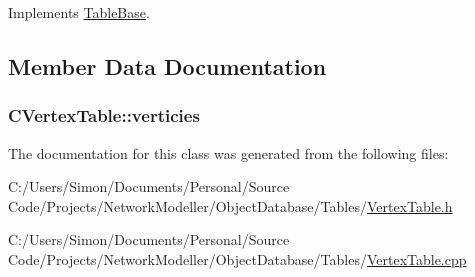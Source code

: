 Implements \hyperlink{class_table_base_a4a4e674632425ee19c24fae2881caefc}{Table\+Base}.



\subsection{Member Data Documentation}
\hypertarget{class_c_vertex_table_a57e0aed3f5222453d13ca5816477354b}{}
\subsubsection[{verticies}]{ C\+Vertex\+Table\+::verticies}\label{class_c_vertex_table_a57e0aed3f5222453d13ca5816477354b}


The documentation for this class was generated from the following files\+:\begin{DoxyCompactItemize}
\item 
C\+:/\+Users/\+Simon/\+Documents/\+Personal/\+Source Code/\+Projects/\+Network\+Modeller/\+Object\+Database/\+Tables/\hyperlink{_vertex_table_8h}{Vertex\+Table.\+h}\item 
C\+:/\+Users/\+Simon/\+Documents/\+Personal/\+Source Code/\+Projects/\+Network\+Modeller/\+Object\+Database/\+Tables/\hyperlink{_vertex_table_8cpp}{Vertex\+Table.\+cpp}\end{DoxyCompactItemize}
